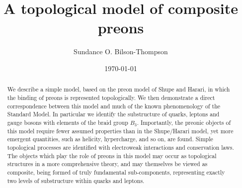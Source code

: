 \documentclass[twocolumn,showpacs,preprintnumbers,amsmath,amssymb]{revtex4}
\begin{document}
\title{A topological model of composite preons}
\author{Sundance O. Bilson-Thompson}
%
%
\date{\today}

\begin{abstract}
We describe a simple model, based on the preon model of Shupe 
and Harari, in which the binding of preons is represented topologically. 
We then demonstrate a direct correspondence between this model and 
much of the known phenomenology of the Standard Model. In particular
we identify the substructure of quarks, leptons and gauge bosons with 
elements of the braid group $B_3$. Importantly, the preonic objects of this 
model require fewer assumed properties than in the Shupe/Harari model, yet 
more emergent quantities, such as helicity, hypercharge, and so on, are found. 
Simple topological processes are identified with electroweak interactions and 
conservation laws. The objects which play the role of preons in this model
may occur as topological structures in a more comprehensive theory, and may 
themselves be viewed as composite, being formed of truly fundamental sub-components, 
representing exactly two levels of substructure within quarks and leptons. 
\end{abstract}

\maketitle

\end{document}
